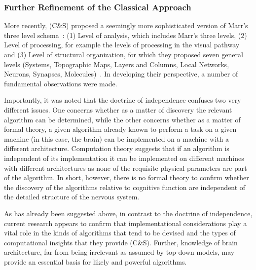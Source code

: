 \documentclass[10pt,letterpaper]{article}
\begin{document}


\subsubsection*{Further Refinement of the Classical Approach}

More recently, (C\&S) proposed a seemingly more sophisticated version of Marr's three level schema~\cite{Marr:1982fk}: (1) Level of analysis, which includes Marr’s three levels, (2) Level of processing, for example the levels of processing in the visual pathway and (3) Level of structural organization, for which they proposed seven general levels (Systems, Topographic Maps, Layers and Columns, Local Networks, Neurons, Synapses, Molecules)~\cite{Churchland:1992uq}.  In developing their perspective, a number of fundamental observations were made.

Importantly, it was noted that the doctrine of independence confuses two very different issues. One concerns whether as a matter of discovery the relevant algorithm can be determined, while the other concerns whether as a matter of formal theory, a given algorithm already known to perform a task on a given machine (in this case, the brain) can be implemented on a machine with a different architecture. Computation theory suggests that if an algorithm is independent of its implementation it can be implemented on different machines with different architectures as none of the requisite physical parameters are part of the algorithm. In short, however, there is no formal theory to confirm whether the discovery of the algorithms relative to cognitive function are independent of the detailed structure of the nervous system.

As has already been suggested above, in contrast to the doctrine of independence, current research appears to confirm that implementational considerations play a vital role in the kinds of algorithms that tend to be devised and the types of computational insights that they provide (C\&S). Further, knowledge of brain architecture, far from being irrelevant as assumed by top-down models, may provide an essential basis for likely and powerful algorithms.
\end{document}
